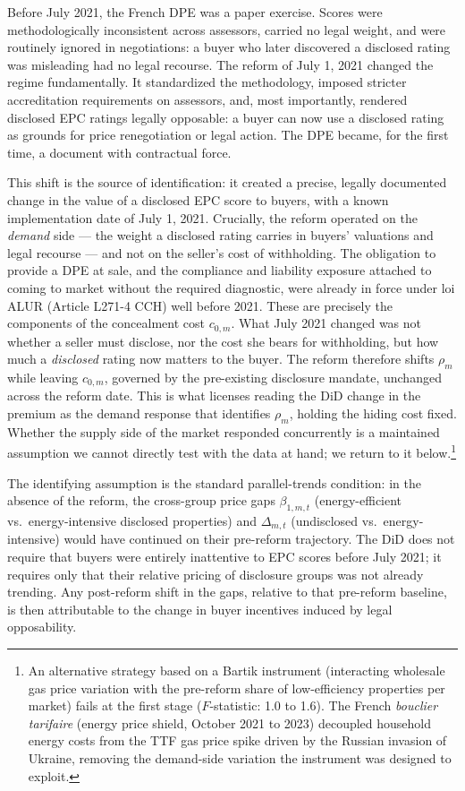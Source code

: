 \documentclass[10pt,letterpaper]{bp-template-concise}
\begin{document}
Before July 2021, the French DPE was a paper exercise. Scores were methodologically inconsistent across assessors, carried no legal weight, and were routinely ignored in negotiations: a buyer who later discovered a disclosed rating was misleading had no legal recourse. The reform of July 1, 2021 changed the regime fundamentally. It standardized the methodology, imposed stricter accreditation requirements on assessors, and, most importantly, rendered disclosed EPC ratings legally opposable: a buyer can now use a disclosed rating as grounds for price renegotiation or legal action. The DPE became, for the first time, a document with contractual force.

This shift is the source of identification: it created a precise, legally documented change in the value of a disclosed EPC score to buyers, with a known implementation date of July 1, 2021. Crucially, the reform operated on the \emph{demand} side --- the weight a disclosed rating carries in buyers' valuations and legal recourse --- and not on the seller's cost of withholding. The obligation to provide a DPE at sale, and the compliance and liability exposure attached to coming to market without the required diagnostic, were already in force under loi ALUR (Article L271-4 CCH) well before 2021. These are precisely the components of the concealment cost $c_{0,m}$. What July 2021 changed was not whether a seller must disclose, nor the cost she bears for withholding, but how much a \emph{disclosed} rating now matters to the buyer. The reform therefore shifts $\rho_m$ while leaving $c_{0,m}$, governed by the pre-existing disclosure mandate, unchanged across the reform date. This is what licenses reading the DiD change in the premium as the demand response that identifies $\rho_m$, holding the hiding cost fixed. Whether the supply side of the market responded concurrently is a maintained assumption we cannot directly test with the data at hand; we return to it below.\footnote{An alternative strategy based on a Bartik instrument (interacting wholesale gas price variation with the pre-reform share of low-efficiency properties per market) fails at the first stage ($F$-statistic: 1.0 to 1.6). The French \emph{bouclier tarifaire} (energy price shield, October 2021 to 2023) decoupled household energy costs from the TTF gas price spike driven by the Russian invasion of Ukraine, removing the demand-side variation the instrument was designed to exploit.}

The identifying assumption is the standard parallel-trends condition: in the absence of the reform, the cross-group price gaps $\beta_{1,m,t}$ (energy-efficient vs.\ energy-intensive disclosed properties) and $\Delta_{m,t}$ (undisclosed vs.\ energy-intensive) would have continued on their pre-reform trajectory. The DiD does not require that buyers were entirely inattentive to EPC scores before July 2021; it requires only that their relative pricing of disclosure groups was not already trending. Any post-reform shift in the gaps, relative to that pre-reform baseline, is then attributable to the change in buyer incentives induced by legal opposability.
\end{document}
